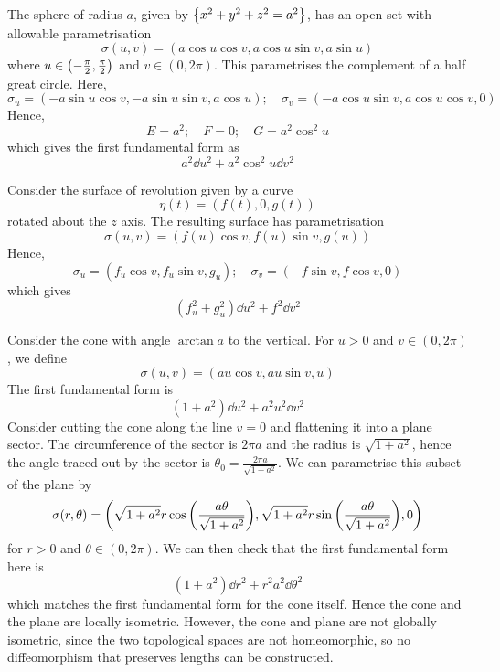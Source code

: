 \documentclass[a4paper]{article}
\begin{document}
\begin{example}
	The sphere of radius \( a \), given by \( \qty{x^2 + y^2 + z^2 = a^2} \), has an open set with allowable parametrisation
	\[
		\sigma(u,v) = (a\cos u \cos v, a \cos u \sin v, a \sin u)
	\]
	where \( u \in \qty(-\frac{\pi}{2}, \frac{\pi}{2}) \) and \( v \in (0,2\pi) \).
	This parametrises the complement of a half great circle.
	Here,
	\[
		\sigma_u = (-a \sin u \cos v, -a \sin u \sin v, a \cos u);\quad \sigma_v = (-a \cos u \sin v, a \cos u \cos v, 0)
	\]
	Hence,
	\[
		E = a^2; \quad F = 0;\quad G = a^2 \cos^2 u
	\]
	which gives the first fundamental form as
	\[
		a^2 \dd{u}^2 + a^2 \cos^2 u \dd{v}^2
	\]
\end{example}
\begin{example}
	Consider the surface of revolution given by a curve
	\[
		\eta(t) = (f(t),0,g(t))
	\]
	rotated about the \( z \) axis.
	The resulting surface has parametrisation
	\[
		\sigma(u,v) = (f(u) \cos v, f(u) \sin v, g(u))
	\]
	Hence,
	\[
		\sigma_u = (f_u \cos v, f_u \sin v, g_u);\quad \sigma_v = (-f \sin v, f \cos v, 0)
	\]
	which gives
	\[
		(f_u^2 + g_u^2) \dd{u}^2 + f^2 \dd{v}^2
	\]
\end{example}
\begin{example}
	Consider the cone with angle \( \arctan a \) to the vertical.
	For \( u > 0 \) and \( v \in (0,2\pi) \), we define
	\[
		\sigma(u,v) = (au\cos v, au\sin v, u)
	\]
	The first fundamental form is
	\[
		(1+a^2)\dd{u}^2 + a^2 u^2 \dd{v}^2
	\]
	Consider cutting the cone along the line \( v = 0 \) and flattening it into a plane sector.
	The circumference of the sector is \( 2 \pi a \) and the radius is \( \sqrt{1+a^2} \), hence the angle traced out by the sector is \( \theta_0 = \frac{2 \pi a}{\sqrt{1+a^2}} \).
	We can parametrise this subset of the plane by
	\[
		\sigma(r,\theta) = \qty(\sqrt{1+a^2} r\cos\qty(\frac{a\theta}{\sqrt{1+a^2}}), \sqrt{1+a^2} r\sin\qty(\frac{a\theta}{\sqrt{1+a^2}}), 0)
	\]
	for \( r > 0 \) and \( \theta \in (0,2\pi) \).
	We can then check that the first fundamental form here is
	\[
		(1+a^2) \dd{r}^2 + r^2 a^2 \dd{\theta}^2
	\]
	which matches the first fundamental form for the cone itself.
	Hence the cone and the plane are locally isometric.
	However, the cone and plane are not globally isometric, since the two topological spaces are not homeomorphic, so no diffeomorphism that preserves lengths can be constructed.
\end{example}
\end{document}
